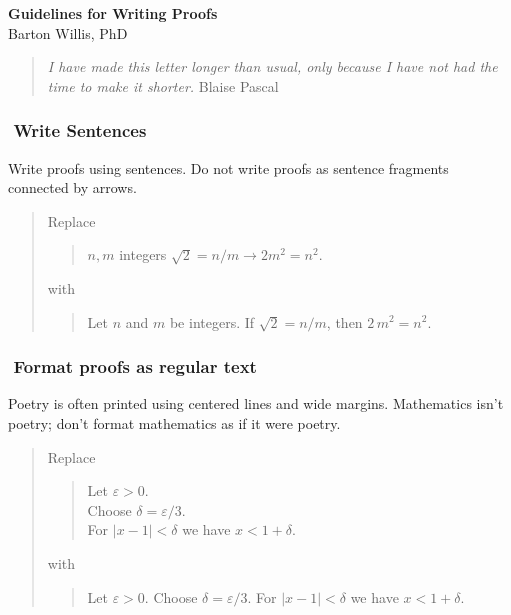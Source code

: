 \documentclass[12pt,fleqn]{article}
\newcounter{ex}\setcounter{ex}{0}
\newcommand{\ex}{%
\hspace{-0.2in} \setcounter{ex}{\value{ex}+1}
\theex \,\,}
\newcounter{id}\setcounter{id}{0}
\newcounter{se}\setcounter{se}{0}
\begin{document}
\begin{flushleft}
\textbf{Guidelines for Writing Proofs} \\
 Barton Willis, PhD
\end{flushleft}

\begin{quote}
{\em I have made this letter longer than usual, only because I have
  not had the time to make it shorter.} \hfill Blaise Pascal
\end{quote}


\subsubsection*{\ex Write Sentences}

Write proofs using sentences. Do not write 
proofs as sentence fragments connected by arrows.
\begin{quote}
Replace
\begin{quote}
\(n,m\) integers \(\sqrt{2} = n / m  \longrightarrow 2 m^2 = n^2\). 
\end{quote}
with
\begin{quote}
Let \(n\) and \(m\) be integers. If \(\sqrt{2} = n / m\), then \(2 \, m^2 = n^2\).
\end{quote}
\end{quote}


\subsubsection*{\ex  Format proofs as regular text}

Poetry is often printed using centered lines and wide
margins. Mathematics isn't poetry; don't format mathematics as if it were poetry.


\begin{quote}
Replace
\begin{quote}
\begin{centering}
Let \(\varepsilon > 0\). \\
Choose \(\delta = \varepsilon / 3 \). \\
For \(|x - 1| < \delta \) we have \(x < 1 + \delta\). \\
\end{centering}
\end{quote}
with
\begin{quote}
Let \(\varepsilon > 0\).  Choose \(\delta = \varepsilon / 3 \).
For \(|x - 1| < \delta \) we have \mbox{\(x<1 + \delta\)}.
\end{quote}
\end{quote}
\end{document}
